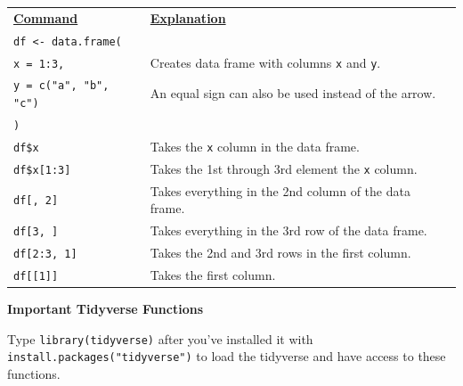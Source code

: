 \documentclass[11pt]{article}
\begin{document}
\begin{longtable}{llc}
	\underline{\bf Command} &  \underline{\bf Explanation}\\
	\texttt{df <- data.frame(}  & \\
	\phantom{.}\hspace{0.1in}\texttt{x = 1:3,} & Creates data frame with columns \texttt{x} and \texttt{y}.\phantom{move this over over over!}\\
	\phantom{.}\hspace{0.1in}\texttt{y = c("a", "b", "c")} & An equal sign can also be used instead of the arrow.\\
	\texttt{)} & \\
	\texttt{df\$x} & Takes the \texttt{x} column in the data frame.\\
	\texttt{df\$x[1:3]} & Takes the 1st through 3rd element the \texttt{x} column.\\
	\texttt{df[, 2]} & Takes everything in the 2nd column of the data frame.\\
	\texttt{df[3, ]} & Takes everything in the 3rd row of the data frame.\\
	\texttt{df[2:3, 1]} & Takes the 2nd and 3rd rows in the first column.\\	
	\texttt{df[[1]]} & Takes the first column.
\end{longtable}

\newpage


\begin{tcolorbox}[width=2.95in, sharp corners=all, colback=white!95!black] %
	{\bf Important Tidyverse Functions}
\end{tcolorbox}
Type \texttt{library(tidyverse)} after you've installed it with \texttt{install.packages("tidyverse")} to load the tidyverse and have access to these functions. 
\end{document}
